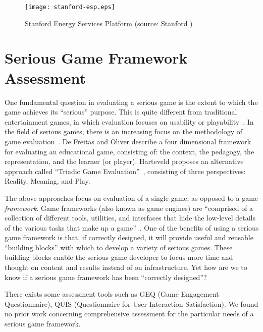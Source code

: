 \begin{figure}[htbp]
	\centering
		\texttt{[image: stanford-esp.eps]}
		\caption{Stanford Energy Services Platform (source: Stanford \cite{Armel-2012})}
		\label{fig:stanford-platform}
\end{figure}

\section{Serious Game Framework Assessment}

One fundamental question in evaluating a serious game is the extent to which the
game achieves its ``serious'' purpose.  This is quite different from 
traditional entertainment games, in which evaluation focuses on usability or
playability~\cite{song2007new}. In the field of serious games, there is an increasing
focus on the methodology of game evaluation~\cite{Mayer2012233}. De Freitas and
Oliver describe a four dimensional framework~\cite{de2006can} for evaluating an
educational game, consisting of: the context, the pedagogy, the representation, and the
learner (or player). Harteveld proposes an alternative approach called ``Triadic Game
Evaluation''~\cite{harteveld2010triadic}, consisting of three perspectives: Reality,
Meaning, and Play.

The above approaches focus on evaluation of a single game, as opposed to a game {\em
  framework}. Game frameworks (also known as game engines) are ``comprised of a collection
of different tools, utilities, and interfaces that hide the low-level details of the
various tasks that make up a game''~\cite{sherrod2006ultimate}. One of the benefits of
using a serious game framework is that, if correctly designed, it will provide useful and
reusable ``building blocks'' with which to develop a variety of serious games.  These
building blocks enable the serious game developer to focus more time and thought on
content and results instead of on infrastructure. Yet how are we to know if a serious
game framework has been ``correctly designed''?

There exists some assessment tools such as GEQ (Game Engagement Questionnaire)\cite{brockmyer2009development}, QUIS (Questionnaire for User Interaction Satisfaction)\cite{harper1993improving}. We found no prior work concerning comprehensive assessment for 
the particular needs of a serious game framework. 